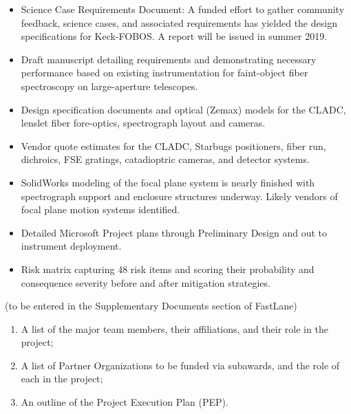 \documentclass[oneside,11pt]{amsart}
\begin{document}
\begin{itemize}
	\item Science Case Requirements Document: A funded effort to gather community feedback, science cases, and associated requirements has yielded the design specifications for Keck-FOBOS.  A report will be issued in summer 2019.

	\item Draft manuscript detailing requirements and demonstrating necessary performance based on existing instrumentation for faint-object fiber spectroscopy on large-aperture telescopes.

	\item Design specification documents and optical (Zemax) models for the CLADC, lenslet fiber fore-optics, spectrograph layout and cameras.

	\item Vendor quote estimates for the CLADC, Starbugs positioners, fiber run, dichroics, FSE gratings, catadioptric cameras, and detector systems.

	\item SolidWorks modeling of the focal plane system is nearly finished with spectrograph support and enclosure structures underway.  Likely vendors of focal plane motion systems identified.

	\item Detailed Microsoft Project plans through Preliminary Design and out to instrument deployment.  

	\item Risk matrix capturing 48 risk items and scoring their probability and consequence severity before and after mitigation strategies.

\end{itemize}

\newpage
{}

(to be entered in the Supplementary Documents section of FastLane)

\begin{enumerate}
%
\item A list of the major team members, their affiliations, and their
role in the project;
%
\item A list of Partner Organizations to be funded via subawards, and
the role of each in the project;
%
\item An outline of the Project Execution Plan (PEP).
\end{enumerate}
\end{document}
